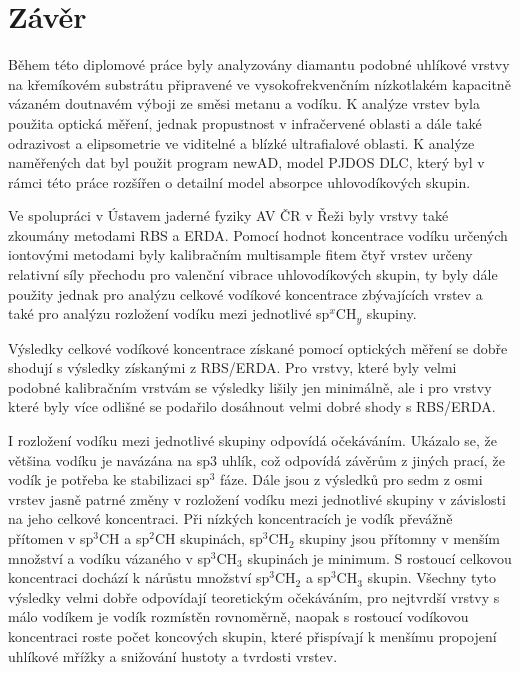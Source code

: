 \chapter*{Závěr}

Během této diplomové práce byly analyzovány diamantu podobné uhlíkové vrstvy na křemíkovém substrátu připravené ve vysokofrekvenčním nízkotlakém kapacitně vázaném doutnavém výboji ze směsi metanu a vodíku. K analýze vrstev byla použita optická měření, jednak propustnost v infračervené oblasti a dále také odrazivost a elipsometrie ve viditelné a blízké ultrafialové oblasti. K analýze naměřených dat byl použit program newAD, model PJDOS DLC, který byl v rámci této práce rozšířen o detailní model absorpce uhlovodíkových skupin. 

Ve spolupráci v Ústavem jaderné fyziky AV ČR v Řeži byly vrstvy také zkoumány metodami RBS a ERDA. Pomocí hodnot koncentrace vodíku určených iontovými metodami byly kalibračním multisample fitem čtyř vrstev určeny relativní síly přechodu pro valenční vibrace uhlovodíkových skupin, ty byly dále použity jednak pro analýzu celkové vodíkové koncentrace zbývajících vrstev a také pro analýzu rozložení vodíku mezi jednotlivé sp$^x$CH$_y$ skupiny. 

Výsledky celkové vodíkové koncentrace získané pomocí optických měření se dobře shodují s výsledky získanými z RBS/ERDA. Pro vrstvy, které byly velmi podobné kalibračním vrstvám se výsledky lišily jen minimálně, ale i pro vrstvy které byly více odlišné se podařilo dosáhnout velmi dobré shody s RBS/ERDA.

I rozložení vodíku mezi jednotlivé skupiny odpovídá očekáváním. Ukázalo se, že většina vodíku je navázána na sp3 uhlík, což odpovídá závěrům z jiných prací, že vodík je potřeba ke stabilizaci sp$^3$ fáze. Dále jsou z výsledků pro sedm z osmi vrstev jasně patrné změny v rozložení vodíku mezi jednotlivé skupiny v závislosti na jeho celkové koncentraci. Při nízkých koncentracích je vodík převážně přítomen v sp$^3$CH a sp$^2$CH skupinách, sp$^3$CH$_2$ skupiny jsou přítomny v menším množství a vodíku vázaného v sp$^3$CH$_3$ skupinách je minimum. S rostoucí celkovou koncentraci dochází k nárůstu množství sp$^3$CH$_2$ a sp$^3$CH$_3$ skupin. Všechny tyto výsledky velmi dobře odpovídají teoretickým očekáváním, pro nejtvrdší vrstvy s málo vodíkem je vodík rozmístěn rovnoměrně, naopak s rostoucí vodíkovou koncentraci roste počet koncových skupin, které přispívají k menšímu propojení uhlíkové mřížky a snižování hustoty a tvrdosti vrstev.


